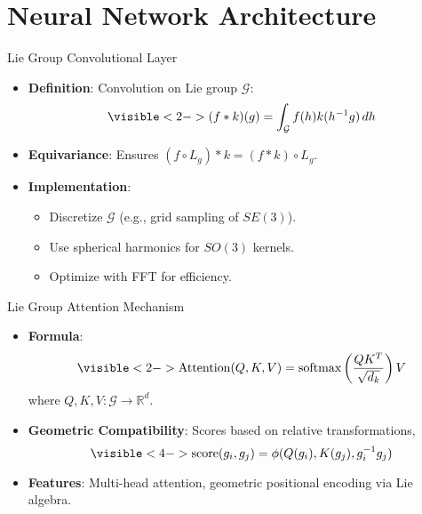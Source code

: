 \documentclass{beamer}
\begin{document}
\section{Neural Network Architecture}
\begin{frame}{Lie Group Convolutional Layer}
  \begin{itemize}
    \item<1-> \textbf{Definition}: Convolution on Lie group $\mathcal{G}$:
      \[
      \visible<2->{(f * k)(g) = \int_{\mathcal{G}} f(h) k(h^{-1} g) \, dh}
      \]
    \item<3-> \textbf{Equivariance}: Ensures $(f \circ L_g) * k = (f * k) \circ L_g$.
    \item<4-> \textbf{Implementation}:
      \begin{itemize}
        \item<5-> Discretize $\mathcal{G}$ (e.g., grid sampling of $SE(3)$).
        \item<6-> Use spherical harmonics for $SO(3)$ kernels.
        \item<7-> Optimize with FFT for efficiency.
      \end{itemize}
  \end{itemize}
\end{frame}

\begin{frame}{Lie Group Attention Mechanism}
  \begin{itemize}
    \item<1-> \textbf{Formula}: 
      \[
      \visible<2->{\text{Attention}(Q, K, V) = \text{softmax}\left( \frac{Q K^T}{\sqrt{d_k}} \right) V}
      \]
      where $Q, K, V: \mathcal{G} \to \mathbb{R}^d$.
    \item<3-> \textbf{Geometric Compatibility}: Scores based on relative transformations, 
      \[
      \visible<4->{\text{score}(g_i, g_j) = \phi(Q(g_i), K(g_j), g_i^{-1} g_j)}
      \]
    \item<5-> \textbf{Features}: Multi-head attention, geometric positional encoding via Lie algebra.
  \end{itemize}
  \begin{center}
  \end{center}
\end{frame}

\end{document}
